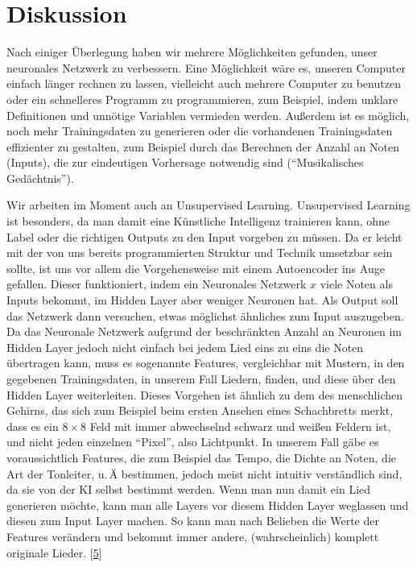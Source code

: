 \documentclass[11pt, a4paper, ngerman]{article}
\begin{document}
\section{Diskussion} \label{Diskussion}
	
	Nach einiger Überlegung haben wir mehrere Möglichkeiten gefunden, unser neuronales Netzwerk zu verbessern. Eine Möglichkeit wäre es, unseren Computer einfach länger rechnen zu lassen, vielleicht auch mehrere Computer zu benutzen oder ein schnelleres Programm zu programmieren, zum Beispiel, indem unklare Definitionen und unnötige Variablen vermieden werden. Außerdem ist es möglich, noch mehr Trainingsdaten zu generieren oder die vorhandenen Trainingsdaten effizienter zu gestalten, zum Beispiel durch das Berechnen der Anzahl an Noten (Inputs), die zur eindeutigen Vorhersage notwendig sind (\enquote{Musikalisches Gedächtnis}).
	
	Wir arbeiten im Moment auch an Unsupervised Learning. Unsupervised Learning ist besonders, da man damit eine Künstliche Intelligenz trainieren kann, ohne Label oder die richtigen Outputs zu den Input vorgeben zu müssen. Da er leicht mit der von uns bereits programmierten Struktur und Technik umsetzbar sein sollte, ist uns vor allem die Vorgehensweise mit einem Autoencoder ins Auge gefallen. Dieser funktioniert, indem ein Neuronales Netzwerk $x$ viele Noten als Inputs bekommt, im Hidden Layer aber weniger Neuronen hat. Als Output soll das Netzwerk dann versuchen, etwas möglichst ähnliches zum Input auszugeben. Da das Neuronale Netzwerk aufgrund der beschränkten Anzahl an Neuronen im Hidden Layer jedoch nicht einfach bei jedem Lied eins zu eins die Noten übertragen kann, muss es sogenannte Features, vergleichbar mit Mustern, in den gegebenen Trainingsdaten, in unserem Fall Liedern, finden, und diese über den Hidden Layer weiterleiten. Dieses Vorgehen ist ähnlich zu dem des menschlichen Gehirns, das sich zum Beispiel beim ersten Ansehen eines Schachbretts merkt, dass es ein $8\times8$ Feld mit immer abwechselnd schwarz und weißen Feldern ist, und nicht jeden einzelnen \enquote{Pixel}, also Lichtpunkt. In unserem Fall gäbe es voraussichtlich Features, die zum Beispiel das Tempo, die Dichte an Noten, die Art der Tonleiter, u.\,Ä bestimmen, jedoch meist nicht intuitiv verständlich sind, da sie von der KI selbst bestimmt werden. Wenn man nun damit ein Lied generieren möchte, kann man alle Layers vor diesem Hidden Layer weglassen und diesen zum Input Layer machen. So kann man nach Belieben die Werte der Features verändern und bekommt immer andere, (wahrscheinlich) komplett originale Lieder. [\hyperref[src:5]{5}]
	
\end{document}
